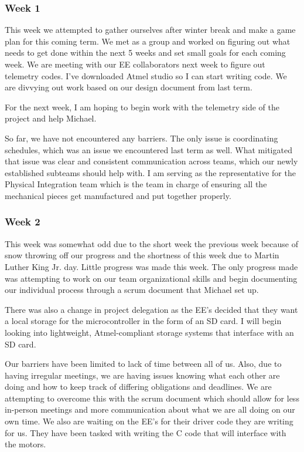 \subsubsection{Week 1}
This week we attempted to gather ourselves after winter break and make a game plan for this coming term. We met as a 
group and worked on figuring out what needs to get done within the next 5 weeks and set small goals for each coming 
week. We are meeting with our EE collaborators next week to figure out telemetry codes. I've downloaded Atmel studio 
so I can start writing code. We are divvying out work based on our design document from last term.

For the next week, I am hoping to begin work with the telemetry side of the project and help Michael.

So far, we have not encountered any barriers. The only issue is coordinating schedules, which was an issue we 
encountered last term as well. What mitigated that issue was clear and consistent communication across teams, which
our newly established subteams should help with. I am serving as the representative for the Physical Integration team
which is the team in charge of ensuring all the mechanical pieces get manufactured and put together properly. 

\subsubsection{Week 2}
This week was somewhat odd due to the short week the previous week because of snow throwing off our progress and the
 shortness of this week due to Martin Luther King Jr. day. Little progress was made this week. The only progress made
 was attempting to work on our team organizational skills and begin documenting our individual process through a 
 scrum document that Michael set up. 

There was also a change in project delegation as the EE's decided that they want a local storage for the 
microcontroller in the form of an SD card. I will begin looking into lightweight, Atmel-compliant storage systems
that interface with an SD card.

Our barriers have been limited to lack of time between all of us. Also, due to having irregular meetings, we are
having issues knowing what each other are doing and how to keep track of differing obligations and deadlines.
We are attempting to overcome this with the scrum document which should allow for less in-person meetings
and more communication about what we are all doing on our own time. We also are waiting on the EE's for their driver 
code they are writing for us. They have been tasked with writing the C code that will interface with the motors.

